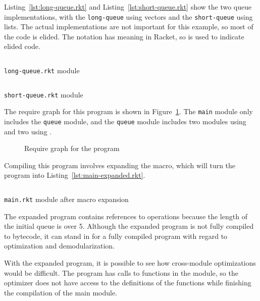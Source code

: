 Listing~\ref{lst:long-queue.rkt} and Listing~\ref{lst:short-queue.rkt} show the two queue implementations, with the \texttt{long-queue} using vectors and the \texttt{short-queue} using lists. 
The actual implementations are not important for this example, so most of the code is elided.
The  notation has meaning in Racket, so \racket{---} is used to indicate elided code.

\begin{listing}
  \inputminted{racket}{listings/long-queue.rkt}
  \caption{\texttt{long-queue.rkt} module}
  \label{lst:long-queue.rkt}
\end{listing}

\begin{listing}
  \inputminted{racket}{listings/short-queue.rkt}
  \caption{\texttt{short-queue.rkt} module}
  \label{lst:short-queue.rkt}
\end{listing}

The require graph for this program is shown in Figure~\ref{fig:queue-modules.tex}.
The \texttt{main} module only includes the \texttt{queue} module, and the \texttt{queue} module includes two modules using  and two using .

\begin{figure}
  
  \caption{Require graph for the  program}
  \label{fig:queue-modules.tex}
\end{figure}

Compiling this program involves expanding the  macro, which will turn the program into Listing~\ref{lst:main-expanded.rkt}.

\begin{listing}
  \inputminted{racket}{listings/main-expanded.rkt}
  \caption{\texttt{main.rkt} module after macro expansion}
  \label{lst:main-expanded.rkt}
\end{listing}

The expanded program contains references to  operations because the length of the initial queue is over 5.
Although the expanded program is not fully compiled to bytecode, it can stand in for a fully compiled program with regard to optimization and demodularization.

With the expanded program, it is possible to see how cross-module optimizations would be difficult.
The program has calls to functions in the  module, so the optimizer does not have access to the definitions of the functions while finishing the compilation of the main module.

